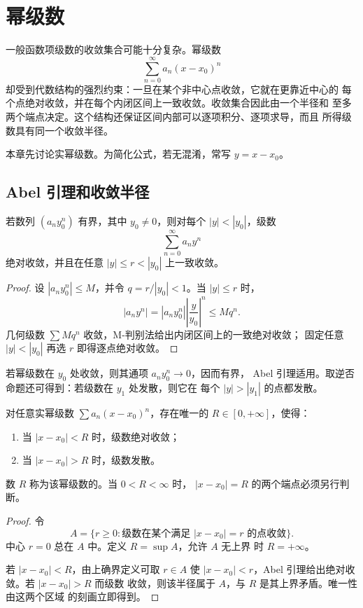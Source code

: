 \chapter{幂级数}
\label{chap:power-series}

一般函数项级数的收敛集合可能十分复杂。幂级数
\[
 \sum_{n=0}^\infty a_n(x-x_0)^n
\]
却受到代数结构的强烈约束：一旦在某个非中心点收敛，它就在更靠近中心的
每个点绝对收敛，并在每个内闭区间上一致收敛。收敛集合因此由一个半径和
至多两个端点决定。这个结构还保证区间内部可以逐项积分、逐项求导，而且
所得级数具有同一个收敛半径。

本章先讨论实幂级数。为简化公式，若无混淆，常写
\(y=x-x_0\)。

\section{Abel 引理和收敛半径}

\begin{lemma}[Abel 引理]
\label{lem:abel-power-series}
若数列 \((a_ny_0^n)\) 有界，其中 \(y_0\ne0\)，则对每个
\(|y|<|y_0|\)，级数
\[
 \sum_{n=0}^\infty a_ny^n
\]
绝对收敛，并且在任意 \(|y|\le r<|y_0|\) 上一致收敛。
\end{lemma}

\begin{proof}
设 \(|a_ny_0^n|\le M\)，并令 \(q=r/|y_0|<1\)。当 \(|y|\le r\)
时，
\[
 |a_ny^n|
 =|a_ny_0^n|\left|\frac y{y_0}\right|^n
 \le Mq^n.
\]
几何级数 \(\sum Mq^n\) 收敛，M-判别法给出内闭区间上的一致绝对收敛；
固定任意 \(|y|<|y_0|\) 再选 \(r\) 即得逐点绝对收敛。
\end{proof}

若幂级数在 \(y_0\) 处收敛，则其通项 \(a_ny_0^n\to0\)，因而有界，
Abel 引理适用。取逆否命题还可得到：若级数在 \(y_1\) 处发散，则它在
每个 \(|y|>|y_1|\) 的点都发散。

\begin{theorem}[收敛半径]
\label{thm:power-series-radius}
对任意实幂级数 \(\sum a_n(x-x_0)^n\)，存在唯一的
\(R\in[0,+\infty]\)，使得：
\begin{enumerate}[label=\textup{(\roman*)}]
 \item 当 \(|x-x_0|<R\) 时，级数绝对收敛；
 \item 当 \(|x-x_0|>R\) 时，级数发散。
\end{enumerate}
数 \(R\) 称为该幂级数的。当 \(0<R<\infty\) 时，
\(|x-x_0|=R\) 的两个端点必须另行判断。
\end{theorem}

\begin{proof}
令
\[
 A=\{r\ge0:\text{级数在某个满足 }|x-x_0|=r\text{ 的点收敛}\}.
\]
中心 \(r=0\) 总在 \(A\) 中。定义 \(R=\sup A\)，允许 \(A\) 无上界
时 \(R=+\infty\)。

若 \(|x-x_0|<R\)，由上确界定义可取 \(r\in A\) 使
\(|x-x_0|<r\)，Abel 引理给出绝对收敛。若 \(|x-x_0|>R\) 而级数
收敛，则该半径属于 \(A\)，与 \(R\) 是其上界矛盾。唯一性由这两个区域
的刻画立即得到。
\end{proof}

